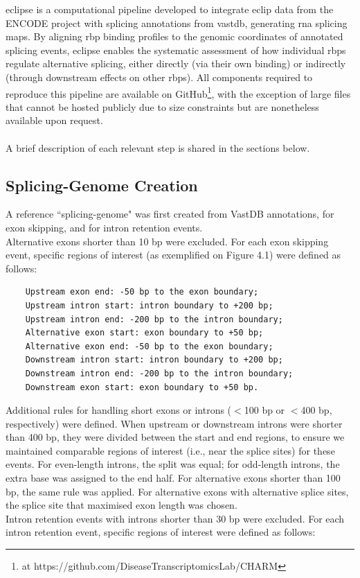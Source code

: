 \gls{eclipse} is a computational pipeline developed to integrate \gls{eclip} data from the ENCODE project\cite{the_encode_project_consortium_integrated_2012} with splicing annotations from \gls{vastdb}\cite{tapial_atlas_2017}, generating \gls{rna} splicing maps. By aligning \gls{rbp} binding profiles to the genomic coordinates of annotated splicing events, \gls{eclipse} enables the systematic assessment of how individual \glspl{rbp} regulate alternative splicing, either directly (via their own binding) or indirectly (through downstream effects on other \glspl{rbp}). All components required to reproduce this pipeline are available on GitHub\footnote{at https://github.com/DiseaseTranscriptomicsLab/CHARM}, with the exception of large files that cannot be hosted publicly due to size constraints but are nonetheless available upon request.
\\
\\
A brief description of each relevant step is shared in the sections below.

\subsection{Splicing-Genome Creation}

A reference ``splicing-genome" was first created from VastDB annotations, for exon skipping, and for intron retention events.
\\
\linebreak
\noindent
Alternative exons shorter than 10 bp were excluded. For each exon skipping event, specific regions of interest (as exemplified on Figure 4.1)  were defined as follows:

\begin{verbatim}
	Upstream exon end: -50 bp to the exon boundary;
	Upstream intron start: intron boundary to +200 bp;
	Upstream intron end: -200 bp to the intron boundary;
	Alternative exon start: exon boundary to +50 bp;
	Alternative exon end: -50 bp to the exon boundary;
	Downstream intron start: intron boundary to +200 bp;
	Downstream intron end: -200 bp to the intron boundary;
	Downstream exon start: exon boundary to +50 bp.
\end{verbatim}
\noindent
Additional rules for handling short exons or introns ($<$100 bp or $<$400 bp, respectively) were defined.  When upstream or downstream introns were shorter than 400 bp, they were divided between the start and end regions, to ensure we maintained comparable regions of interest (i.e., near the splice sites) for these events. For even-length introns, the split was equal; for odd-length introns, the extra base was assigned to the end half. For alternative exons shorter than 100 bp, the same rule was applied. For alternative exons with alternative splice sites, the splice site that maximised exon length was chosen.
\\
\linebreak
\noindent
Intron retention events with introns shorter than 30 bp were excluded. For each intron retention event, specific regions of interest were defined as follows:

